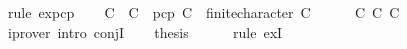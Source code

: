 \begin{isabellebody}
\ {\isacharparenleft}rule\ ex{}{\isacharunderscore}pcp{\isacharparenright}\isanewline
\ \ \isamarkupfalse%
\ {\isachardoublequoteopen}C\ {\isasymsubseteq}\ {\isacharquery}C{\isacharprime}\ {\isasymand}\ pcp\ {\isacharquery}C{\isacharprime}\ {\isasymand}\ finite{\isacharunderscore}character\ {\isacharquery}C{\isacharprime}{\isachardoublequoteclose}\isanewline
\ \ \ \ \isamarkupfalse%
\ C{}\ C{}\ C{}\ \isamarkupfalse%
\ {\isacharparenleft}iprover\ intro{\isacharcolon}\ conjI{\isacharparenright}\isanewline
\ \ \isamarkupfalse%
\ {\isacharquery}thesis\isanewline
\ \ \ \ \isamarkupfalse%
\ {\isacharparenleft}rule\ exI{\isacharparenright}\isanewline
{}\isamarkupfalse%
\isanewline
%
\endisatagproof
{\isafoldproof}%
%
\isadelimproof
%
\endisadelimproof
%
\isadelimtheory
%
\endisadelimtheory
%
\isatagtheory
%
\endisatagtheory
{\isafoldtheory}%
%
\isadelimtheory
%
\endisadelimtheory
%
\end{isabellebody}%
\endinput
